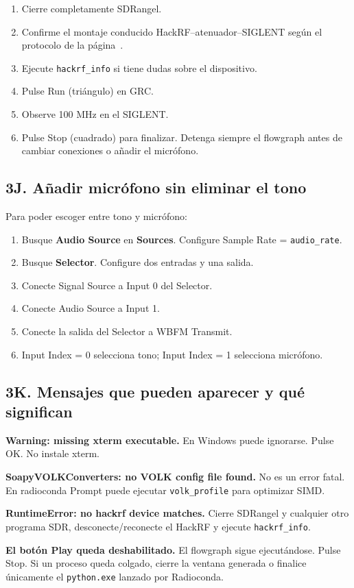 \begin{enumerate}
    \item Cierre completamente SDRangel.
    \item Confirme el montaje conducido HackRF--atenuador--SIGLENT según el protocolo de la página~\pageref{sec:protocolo-tx}.
    \item Ejecute \texttt{hackrf\_info} si tiene dudas sobre el dispositivo.
    \item Pulse Run (triángulo) en GRC.
    \item Observe 100 MHz en el SIGLENT.
    \item Pulse Stop (cuadrado) para finalizar. Detenga siempre el flowgraph antes de cambiar conexiones o añadir el micrófono.
\end{enumerate}

\subsection{3J. Añadir micrófono sin eliminar el tono}

Para poder escoger entre tono y micrófono:

\begin{enumerate}
    \item Busque \textbf{Audio Source} en \textbf{Sources}. Configure Sample Rate = \texttt{audio\_rate}.
    \item Busque \textbf{Selector}. Configure dos entradas y una salida.
    \item Conecte Signal Source a Input 0 del Selector.
    \item Conecte Audio Source a Input 1.
    \item Conecte la salida del Selector a WBFM Transmit.
    \item Input Index = 0 selecciona tono; Input Index = 1 selecciona micrófono.
\end{enumerate}

\subsection{3K. Mensajes que pueden aparecer y qué significan}

\begin{diagnostico}
\textbf{Warning: missing xterm executable.} En Windows puede ignorarse. Pulse OK. No instale xterm.

\textbf{SoapyVOLKConverters: no VOLK config file found.} No es un error fatal. En radioconda Prompt puede ejecutar \texttt{volk\_profile} para optimizar SIMD.

\textbf{RuntimeError: no hackrf device matches.} Cierre SDRangel y cualquier otro programa SDR, desconecte/reconecte el HackRF y ejecute \texttt{hackrf\_info}.

\textbf{El botón Play queda deshabilitado.} El flowgraph sigue ejecutándose. Pulse Stop. Si un proceso queda colgado, cierre la ventana generada o finalice únicamente el \texttt{python.exe} lanzado por Radioconda.
\end{diagnostico}


